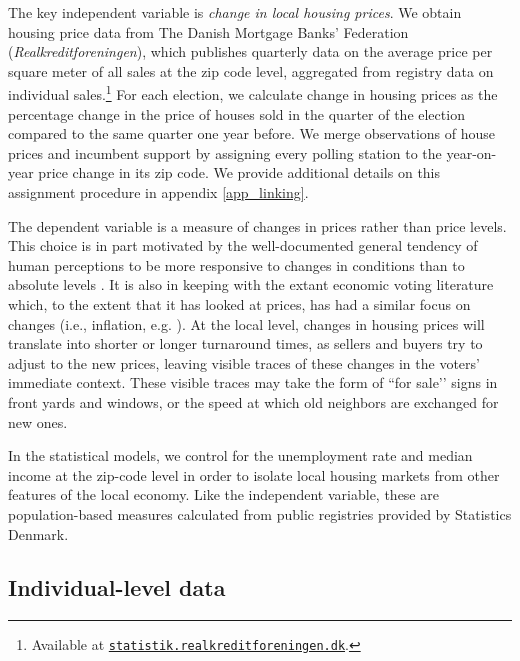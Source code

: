 \documentclass[12pt,a4paper]{article}
\begin{document}
	The key independent variable is \textit{change in local housing prices}. We obtain housing price data from The Danish Mortgage Banks' Federation (\textit{Realkreditforeningen}), which publishes quarterly data on the average price per square meter of all sales at the zip code level, aggregated from registry data on individual sales.\footnote{Available at \texttt{\href{http://statistik.realkreditforeningen.dk/}{statistik.realkreditforeningen.dk}}.} For each election, we calculate change in housing prices as the percentage change in the price of houses sold in the quarter of the election compared to the same quarter one year before. We merge observations of house prices and incumbent support by assigning every polling station to the year-on-year price change in its zip code. We provide additional details on this assignment procedure in appendix \ref{app_linking}.
	
	The dependent variable is a measure of changes in prices rather than price levels. This choice is in part motivated by the well-documented general tendency of human perceptions to be more responsive to changes in conditions than to absolute levels \citep{kahneman1979prospect}. It is also in keeping with the extant economic voting literature which, to the extent that it has looked at prices, has had a similar focus on changes (i.e., inflation, e.g. \citealp{kramer1971short}). At the local level, changes in housing prices will translate into shorter or longer turnaround times, as sellers and buyers try to adjust to the new prices, leaving visible traces of these changes in the voters’ immediate context. These visible traces may take the form of ``for sale’’ signs in front yards and windows, or the speed at which old neighbors are exchanged for new ones.
	
	In the statistical models, we control for the unemployment rate and median income at the zip-code level in order to isolate local housing markets from other features of the local economy. Like the independent variable, these are population-based measures calculated from public registries provided by Statistics Denmark.
	
	\subsection{Individual-level data}\label{individuallevel}
	
\end{document}
